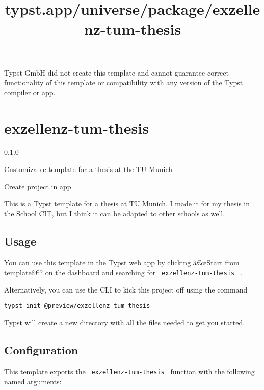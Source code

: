 Typst GmbH did not create this template and cannot guarantee correct
functionality of this template or compatibility with any version of the
Typst compiler or app.


\title{typst.app/universe/package/exzellenz-tum-thesis}

\label{banner}
\label{template-thumbnail}

\section{exzellenz-tum-thesis}\label{exzellenz-tum-thesis}

{ 0.1.0 }

Customizable template for a thesis at the TU Munich

\href{/app?template=exzellenz-tum-thesis&version=0.1.0}{Create project
in app}

\label{readme}
This is a Typst template for a thesis at TU Munich. I made it for my
thesis in the School CIT, but I think it can be adapted to other schools
as well.

\subsection{Usage}\label{usage}

You can use this template in the Typst web app by clicking â€œStart from
templateâ€? on the dashboard and searching for
\texttt{\ exzellenz-tum-thesis\ } .

Alternatively, you can use the CLI to kick this project off using the
command

\begin{verbatim}
typst init @preview/exzellenz-tum-thesis
\end{verbatim}

Typst will create a new directory with all the files needed to get you
started.

\subsection{Configuration}\label{configuration}

This template exports the \texttt{\ exzellenz-tum-thesis\ } function
with the following named arguments:

